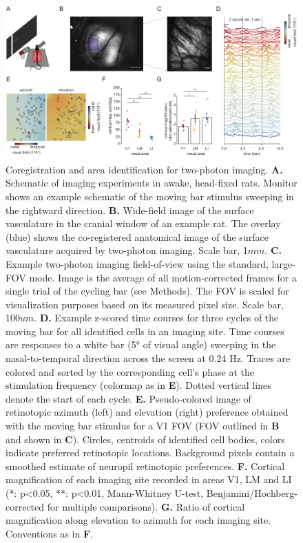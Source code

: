 \begin{figure}[t!]
    \includegraphics[width=\textwidth]{figures/chapter_3/fig_3-2_2p_retino/fig_3-2_2p_retino.pdf}
    \vspace{.1in}
    \caption[Area identification]{Coregistration and area identification for two-photon imaging. 
    \textbf{A.} Schematic of imaging experiments in awake, head-fixed rats. Monitor shows an example schematic of the moving bar stimulus sweeping in the rightward direction. 
    \textbf{B.} Wide-field image of the surface vasculature in the cranial window of an example rat. The overlay (blue) shows the co-registered anatomical image of the surface vasculature acquired by two-photon imaging. Scale bar, 1$mm$. 
    \textbf{C.} Example two-photon imaging field-of-view using the standard, large-FOV mode. Image is the average of all motion-corrected frames for a single trial of the cycling bar (see Methods). The FOV is scaled for visualization purposes based on its measured pixel size. Scale bar, 100$um$. 
    \textbf{D.} Example z-scored time courses for three cycles of the moving bar for all identified cells in an imaging site. Time courses are responses to a white bar (\ang{5} of visual angle) sweeping in the nasal-to-temporal direction across the screen at 0.24 Hz. Traces are colored and sorted by the corresponding cell's phase at the stimulation frequency (colormap as in \textbf{E}). Dotted vertical lines denote the start of each cycle. 
    \textbf{E.} Pseudo-colored image of retinotopic azimuth (left) and elevation (right) preference obtained with the moving bar stimulus for a V1 FOV (FOV outlined in \textbf{B} and shown in \textbf{C}). Circles, centroids of identified cell bodies, colors indicate preferred retinotopic locations. Background pixels contain a smoothed estimate of neuropil retinotopic preferences. 
    \textbf{F.} Cortical magnification of each imaging site recorded in areas V1, LM and LI (*: p<0.05, **: p<0.01, Mann-Whitney U-test, Benjamini/Hochberg-corrected for multiple comparisons). 
    \textbf{G.} Ratio of cortical magnification along elevation to azimuth for each imaging site. Conventions as in \textbf{F}.   
    \label{fig:2p_retino}}
\end{figure}

